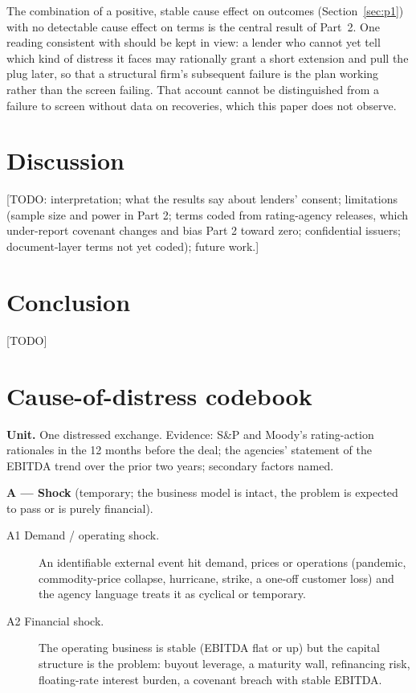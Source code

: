 \documentclass[12pt]{article}
\begin{document}


The combination of a positive, stable cause effect on outcomes (Section~\ref{sec:p1}) with no detectable cause effect on terms is the central result of Part~2. One reading consistent with \citet{kahl2002} should be kept in view: a lender who cannot yet tell which kind of distress it faces may rationally grant a short extension and pull the plug later, so that a structural firm's subsequent failure is the plan working rather than the screen failing. That account cannot be distinguished from a failure to screen without data on recoveries, which this paper does not observe.

\section{Discussion}
[TODO: interpretation; what the results say about lenders' consent; limitations (sample size and power in Part 2; terms coded from rating-agency releases, which under-report covenant changes and bias Part 2 toward zero; confidential issuers; document-layer terms not yet coded); future work.]

\section{Conclusion}
[TODO]



\appendix
\section{Cause-of-distress codebook}
\label{app:codebook}

\noindent\textbf{Unit.} One distressed exchange. Evidence: S\&P and Moody's rating-action rationales in the 12 months before the deal; the agencies' statement of the EBITDA trend over the prior two years; secondary factors named.

\medskip\noindent\textbf{A --- Shock} (temporary; the business model is intact, the problem is expected to pass or is purely financial).
\begin{description}
  \item[A1 Demand / operating shock.] An identifiable external event hit demand, prices or operations (pandemic, commodity-price collapse, hurricane, strike, a one-off customer loss) and the agency language treats it as cyclical or temporary.
  \item[A2 Financial shock.] The operating business is stable (EBITDA flat or up) but the capital structure is the problem: buyout leverage, a maturity wall, refinancing risk, floating-rate interest burden, a covenant breach with stable EBITDA.
\end{description}
\end{document}
